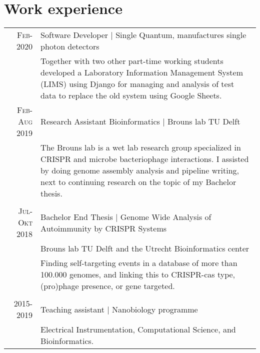 \documentclass[a4paper,10pt]{article} %
\begin{document}
\section{Work experience}

\begin{tabular}{r|p{13cm}}

    \textsc{Feb- 2020} & Software Developer | Single Quantum, manufactures single photon detectors \\
                          & \footnotesize{Together with two other part-time working students developed a Laboratory Information Management System (LIMS) using Django for managing and analysis of test data to replace the old system using Google Sheets.} \\

    \textsc{Feb-Aug 2019} & Research Assistant Bioinformatics | Brouns lab TU Delft \\
                          & \footnotesize{The Brouns lab is a wet lab research group specialized in CRISPR and microbe bacteriophage interactions.
                          I assisted by doing genome assembly analysis and pipeline writing, next to continuing research on the topic of my Bachelor thesis.} \\

\multicolumn{2}{c}{} \\

    \textsc{Jul-Okt 2018} & Bachelor End Thesis | Genome Wide Analysis of Autoimmunity by CRISPR Systems \\
                          & Brouns lab TU Delft and the Utrecht Bioinformatics center \\
                          & \footnotesize{Finding self-targeting events in a database of more than 100.000 genomes, and linking this to CRISPR-cas type, (pro)phage presence, or gene targeted.} \\


\multicolumn{2}{c}{} \\

    \textsc{2015-2019} & Teaching assistant | Nanobiology programme\\
                       & \footnotesize{Electrical Instrumentation, Computational Science, and Bioinformatics.} \\



\end{tabular}
\end{document}
